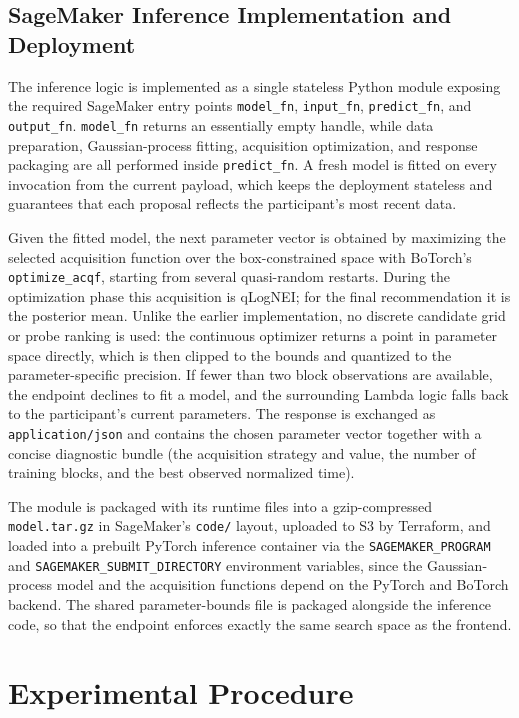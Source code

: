 \subsection{SageMaker Inference Implementation and Deployment}

The inference logic is implemented as a single stateless Python module exposing the required SageMaker entry points \texttt{model\_fn}, \texttt{input\_fn}, \texttt{predict\_fn}, and \texttt{output\_fn}. \texttt{model\_fn} returns an essentially empty handle, while data preparation, Gaussian-process fitting, acquisition optimization, and response packaging are all performed inside \texttt{predict\_fn}. A fresh model is fitted on every invocation from the current payload, which keeps the deployment stateless and guarantees that each proposal reflects the participant's most recent data.

Given the fitted model, the next parameter vector is obtained by maximizing the selected acquisition function over the box-constrained space with BoTorch's \texttt{optimize\_acqf}, starting from several quasi-random restarts. During the optimization phase this acquisition is qLogNEI; for the final recommendation it is the posterior mean. Unlike the earlier implementation, no discrete candidate grid or probe ranking is used: the continuous optimizer returns a point in parameter space directly, which is then clipped to the bounds and quantized to the parameter-specific precision. If fewer than two block observations are available, the endpoint declines to fit a model, and the surrounding Lambda logic falls back to the participant's current parameters. The response is exchanged as \texttt{application/json} and contains the chosen parameter vector together with a concise diagnostic bundle (the acquisition strategy and value, the number of training blocks, and the best observed normalized time).

The module is packaged with its runtime files into a gzip-compressed \texttt{model.tar.gz} in SageMaker's \texttt{code/} layout, uploaded to S3 by Terraform, and loaded into a prebuilt PyTorch inference container via the \texttt{SAGEMAKER\_PROGRAM} and \texttt{SAGEMAKER\_SUBMIT\_DIRECTORY} environment variables, since the Gaussian-process model and the acquisition functions depend on the PyTorch and BoTorch backend. The shared parameter-bounds file is packaged alongside the inference code, so that the endpoint enforces exactly the same search space as the frontend.

\section{Experimental Procedure}
\label{sec:procedure}

